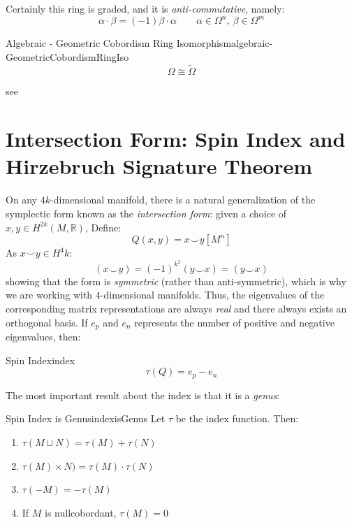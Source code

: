 \documentclass{book}
\newenvironment{Proof}[1][]
  {\begin{ProofTcb}[#1]}
  {\end{ProofTcb}}
\newcommand{\R}{{\mathbb{R}}}
\newcommand{\dcup}{\sqcup}
\begin{document}
Certainly this ring is graded, and it is \emph{anti-commutative}, namely:
\[
  \alpha\cdot \beta = (-1)\beta\cdot\alpha \qquad \alpha \in \Omega^n,\ \beta \in \Omega^m
\]

\begin{thm}{Algebraic - Geometric Cobordism Ring Isomorphism}{algebraic-GeometricCobordismRingIso}
  \[
    \Omega \cong \widetilde{\Omega}
  \]
\end{thm}

\begin{Proof}
  see~\cite[section~7]{hirzebruchTopologicalMethodsAlgebraic1995}
\end{Proof}


\section{Intersection Form: Spin Index and Hirzebruch Signature Theorem}\label{sec:index}

On any $4k$-dimensional manifold, there is a natural generalization of the symplectic form known as the
\emph{intersection form}: given a choice of $x,y \in H^{2k}(M, \R)$, Define:
\[
  Q(x,y) = x\smile y[M^n]
\]
As $x\smile y \in H^4k$:
\[
  (x\smile y) = (-1)^{k^2}(y\smile x) = (y\smile x)
\]
showing that the form is \emph{symmetric} (rather than anti-symmetric), which is why we are working with
$4$-dimensional manifolds. Thus, the eigenvalues of the corresponding matrix representations are always
\emph{real} and there always exists an orthogonal basis. If $e_p$ and $e_n$ represents the number of positive
and negative eigenvalues, then:
\begin{defn}{Spin Index}{index}
  \[
  \tau(Q) = e_p - e_n
\]
\end{defn}

The most important result about the index is that it is a \emph{genus}:

\begin{thm}{Spin Index is Genus}{indexisGenus}
  Let $\tau$ be the index function. Then:
  \begin{enumerate}
    \item $\tau(M\dcup N) = \tau(M) + \tau(N)$
    \item $\tau(M)\times N) =\tau(M)\cdot \tau(N)$
    \item $\tau(-M) = -\tau(M)$
    \item If $M$ is nullcobordant, $\tau(M) = 0$
  \end{enumerate}
\end{thm}
\end{document}
